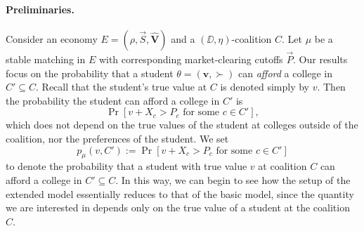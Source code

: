 \documentclass[10pt]{article}
\begin{document}
\begin{ReviewVerbatim}
\paragraph{Preliminaries.}
Consider an economy $E = (\rho, \vec{S}, \hat{\bm{V}})$ and a $(\DD, \eta)$-coalition $C$. Let $\mu$ be a stable matching in $E$ with corresponding market-clearing cutoffs $\vec{P}$. Our results focus on the probability that a student $\theta=(\bm{v},\succ)$ can \textit{afford} a college in $C'\subseteq C$. Recall that the student's true value at $C$ is denoted simply by $v$. Then the probability the student can afford a college in $C'$ is
\begin{equation}
    \Pr[v + X_c > P_c\text{ for some $c\in C'$}],
\end{equation}
which does not depend on the true values of the student at colleges outside of the coalition, nor the preferences of the student. We set
\begin{equation}
    p_\mu(v, C') := \Pr[v + X_c > P_c\text{ for some $c\in C'$}]
\end{equation}
to denote the probability that a student with true value $v$ at coalition $C$ can afford a college in $C'\subseteq C$. In this way, we can begin to see how the setup of the extended model essentially reduces to that of the basic model, since the quantity we are interested in depends only on the true value of a student at the coalition $C$.
\end{ReviewVerbatim}
\end{document}
